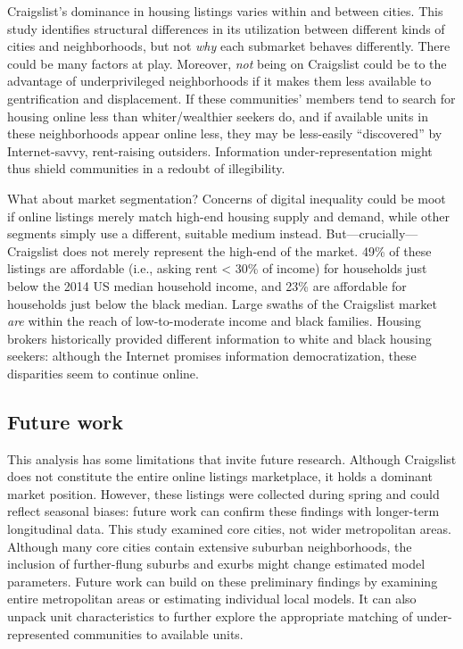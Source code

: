 \documentclass[11pt,onecolumn]{article} %
\begin{document}
Craigslist's dominance in housing listings varies within and between cities. This study identifies structural differences in its utilization between different kinds of cities and neighborhoods, but not \emph{why} each submarket behaves differently. There could be many factors at play. Moreover, \emph{not} being on Craigslist could be to the advantage of underprivileged neighborhoods if it makes them less available to gentrification and displacement. If these communities' members tend to search for housing online less than whiter/wealthier seekers do, and if available units in these neighborhoods appear online less, they may be less-easily \enquote{discovered} by Internet-savvy, rent-raising outsiders. Information under-representation might thus shield communities in a redoubt of illegibility.

What about market segmentation? Concerns of digital inequality could be moot if online listings merely match high-end housing supply and demand, while other segments simply use a different, suitable medium instead. But---crucially---Craigslist does not merely represent the high-end of the market. 49\% of these listings are affordable (i.e., asking rent < 30\% of income) for households just below the 2014 US median household income, and 23\% are affordable for households just below the black median. Large swaths of the Craigslist market \emph{are} within the reach of low-to-moderate income and black families. Housing brokers historically provided different information to white and black housing seekers: although the Internet promises information democratization, these disparities seem to continue online.

\subsection{Future work}

This analysis has some limitations that invite future research. Although Craigslist does not constitute the entire online listings marketplace, it holds a dominant market position. However, these listings were collected during spring and could reflect seasonal biases: future work can confirm these findings with longer-term longitudinal data. This study examined core cities, not wider metropolitan areas. Although many core cities contain extensive suburban neighborhoods, the inclusion of further-flung suburbs and exurbs might change estimated model parameters. Future work can build on these preliminary findings by examining entire metropolitan areas or estimating individual local models. It can also unpack unit characteristics to further explore the appropriate matching of under-represented communities to available units.
\end{document}
